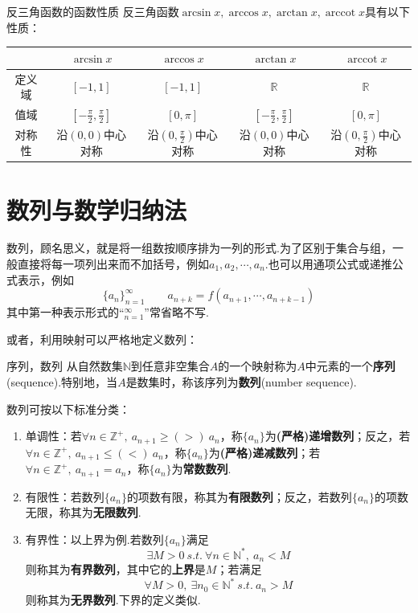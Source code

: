 \documentclass[lang=cn, zihao=5]{elegantbook}
\DeclareMathOperator{\arccot}{arccot}
\begin{document}
\begin{proposition}{反三角函数的函数性质}
    反三角函数$\arcsin{x},\arccos{x},\arctan{x},\arccot{x}$具有以下性质：

    \vspace{1em}
    \centering
    \renewcommand\arraystretch{1.2}
    \begin{tabular}{c|c|c|c|c}
        \hline
          & $\arcsin{x}$ & $\arccos{x}$ & $\arctan{x}$ & $\arccot{x}$ \\ \hline
        定义域 & $[-1,1]$ & $[-1,1]$ & $\mathbb{R}$ & $\mathbb{R}$ \\ \hline
        值域 & $[-\frac{\pi}{2} ,\frac{\pi}{2}]$ & $[0,\pi]$ & $[-\frac{\pi}{2},\frac{\pi}{2}]$ & $[0,\pi]$ \\ \hline
        对称性 & 沿$(0,0)$中心对称 & 沿$(0,\frac{\pi}{2})$中心对称 & 沿$(0,0)$中心对称 & 沿$(0,\frac{\pi}{2})$中心对称 \\ \hline
    \end{tabular}
    
\end{proposition}


\chapter{数列与数学归纳法}

数列，顾名思义，就是将一组数按顺序排为一列的形式.为了区别于集合与组，一般直接将每一项列出来而不加括号，例如$a_1,a_2, \cdots ,a_n$.也可以用通项公式或递推公式表示，例如
$$\{ a_n \}_{n=1}^{\infty} \qquad a_{n+k}=f(a_{n+1}, \cdots ,a_{n+k-1})$$
其中第一种表示形式的“$_{n=1}^{\infty}$”常省略不写.

或者，利用映射可以严格地定义数列：

\begin{definition}{序列，数列}
	从自然数集$\mathbb{N}$到任意非空集合$A$的一个映射称为$A$中元素的一个\textbf{序列}(sequence).特别地，当$A$是数集时，称该序列为\textbf{数列}(number sequence).
\end{definition}

数列可按以下标准分类：
\begin{enumerate}
	\item 单调性：若$\forall n \in \mathbb{Z}^+,~ a_{n+1} \geq (>)~ a_n$，称$\{ a_n \}$为\textbf{(严格)递增数列}；反之，若$\forall n \in \mathbb{Z}^+,~ a_{n+1} \leq (<)~ a_n$，称$\{ a_n \}$为\textbf{(严格)递减数列}；若$\forall n \in \mathbb{Z}^+,~ a_{n+1} = a_n$，称$\{ a_n \}$为\textbf{常数数列}.
	\item 有限性：若数列$\{ a_n \}$的项数有限，称其为\textbf{有限数列}；反之，若数列$\{ a_n \}$的项数无限，称其为\textbf{无限数列}.
	\item 有界性：以上界为例.若数列$\{ a_n \}$满足
	$$\exists M > 0 ~s.t.~ \forall n \in \mathbb{N}^{*},~ a_n<M$$
	则称其为\textbf{有界数列}，其中它的\textbf{上界}是$M$；若满足
	$$\forall M > 0 ,~ \exists n_0 \in \mathbb{N}^{*} ~s.t.~ a_n>M$$
	则称其为\textbf{无界数列}.下界的定义类似.
\end{enumerate}
\end{document}
